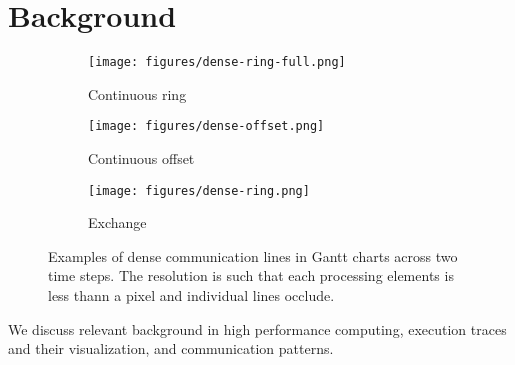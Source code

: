 \section{Background}
\label{sec:background}

\begin{figure}
    \centering
    \begin{subfigure}{0.15\textwidth}
        \centering
        \texttt{[image: figures/dense-ring-full.png]}
        \caption{Continuous ring}
        \label{fig:dense-ring}
    \end{subfigure}
    \begin{subfigure}{0.15\textwidth}
        \centering
        \texttt{[image: figures/dense-offset.png]}
        \caption{Continuous offset}
        \label{fig:dense-offset}
    \end{subfigure}
    \begin{subfigure}{0.15\textwidth}
        \centering
        \texttt{[image: figures/dense-ring.png]}
        \caption{Exchange}
        \label{fig:dense-exchange}
    \end{subfigure}
    
    \caption{Examples of dense communication lines in Gantt charts across two time steps. The resolution is such that each processing elements is less thann a pixel and individual lines occlude. }
    \label{fig:dense_gantt}
\end{figure}


We discuss relevant background in high performance computing, execution traces and their visualization, and communication patterns.

